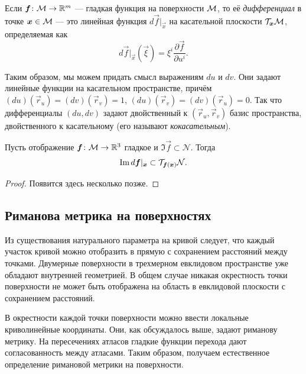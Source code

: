 %
\begin{definition}
	Если $\boldsymbol{f}\colon\mathcal{M} \to \mathbb{R}^m$ --- гладкая функция на поверхности $\mathcal{M}$, то её \textit{дифференциал} в точке $\boldsymbol{x} \in \mathcal{M}$ --- это линейная функция $d\vec{f}|_{\vec{x}}$ на касательной плоскости $\mathcal{T}_{\boldsymbol{x}}\mathcal{M}$, определяемая как
	\[
		d\vec{f}|_{\vec{x}}(\vec{\xi}) = \xi^i\frac{\partial \vec{f}}{\partial u^i}.
	\]
\end{definition}

Таким образом, мы можем придать смысл выражениям $du$ и $dv$. Они задают линейные функции на касательном пространстве, причём $(du)(\vec{r}_u) = (dv)(\vec{r}_v) = 1$, $(du)(\vec{r}_v) = (dv)(\vec{r}_u) = 0$. Так что дифференциалы $(du, dv)$ задают двойственный к $(\vec{r}_u, \vec{r}_v)$ базис пространства, двойственного к касательному (его называют \textit{кокасательным}).

\begin{proposition}
	Пусть отображение $\boldsymbol{f}\colon \mathcal{M} \to \mathbb{R}^3$ гладкое и $\Im\vec{f} \subset \mathcal{N}$. Тогда
	\[
		\operatorname{Im} d\boldsymbol{f}|_{\boldsymbol{x}} \subset \mathcal{T}_{\boldsymbol{f}(\boldsymbol{x})}\mathcal{N}.
	\]
\end{proposition}

\begin{proof} %
	Появится здесь несколько позже.
\end{proof}

\subsection{Риманова метрика на поверхностях}

Из существования натурального параметра на кривой следует, что каждый участок кривой можно отобразить в прямую с сохранением расстояний между точками. Двумерные поверхности в трехмерном евклидовом пространстве уже обладают внутренней геометрией. В общем случае никакая окрестность точки поверхности не может быть отображена на область в евклидовой плоскости с сохранением расстояний.

В окрестности каждой точки поверхности можно ввести локальные криволинейные координаты. Они, как обсуждалось выше, задают риманову метрику. На пересечениях атласов гладкие функции перехода дают согласованность между атласами. Таким образом, получаем естественное определение римановой метрики на поверхности.

